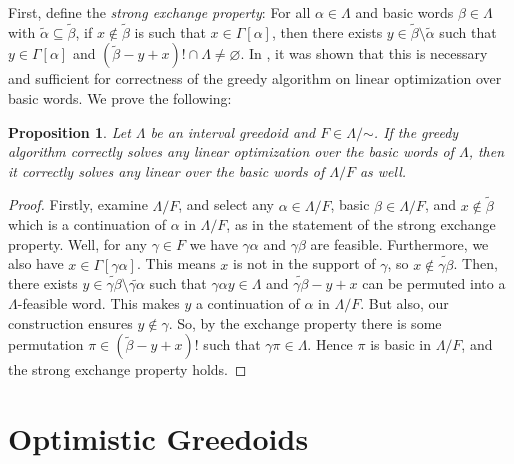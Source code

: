 \documentclass[11pt]{article}
\newtheorem{proposition}[theorem]{Proposition}
\newcommand{\glang}{\Lambda}
\begin{document}
First, define the \emph{strong exchange property}:
For all $\alpha \in \glang$ and basic words $\beta \in \glang$ with $\widetilde{\alpha}\subseteq\widetilde{\beta}$, if $x \notin\widetilde{\beta}$ is such that $x \in \Gamma[\alpha]$, then there exists $y\in\widetilde{\beta}\setminus\widetilde{\alpha}$ such that $y \in \Gamma[\alpha]$ and $(\widetilde{\beta} - y + x)!\cap\glang \neq \varnothing$.
In \cite{korte1984greedoids,goetschel1986linear}, it was shown that this is necessary and sufficient for correctness of the greedy algorithm on linear optimization over basic words.
We prove the following:
\begin{proposition}
    Let $\glang$ be an interval greedoid and $F\in\glang/\mathord{\sim}$.
    If the greedy algorithm correctly solves any linear optimization over the basic words of $\glang$, then it correctly solves any linear over the basic words of $\glang/F$ as well.
\end{proposition}
\begin{proof}
    Firstly, examine $\glang/F$, and select any $\alpha\in\glang/F$, basic $\beta\in\glang/F$, and $x\notin\widetilde{\beta}$ which is a continuation of $\alpha$ in $\glang/F$, as in the statement of the strong exchange property.
    Well, for any $\gamma\in F$ we have $\gamma\alpha$ and $\gamma\beta$ are feasible.
    Furthermore, we also have $x\in\Gamma[\gamma \alpha]$.
    This means $x$ is not in the support of $\gamma$, so $x \notin \widetilde{\gamma\beta}$.
    Then, there exists $y\in\widetilde{\gamma\beta}\setminus\widetilde{\gamma\alpha}$ such that $\gamma \alpha y\in\glang$ and $\widetilde{\gamma\beta} - y + x$ can be permuted into a $\glang$-feasible word.
    This makes $y$ a continuation of $\alpha$ in $\glang/F$.
    But also, our construction ensures $y \notin\gamma$.
    So, by the exchange property there is some permutation $\pi \in (\widetilde{\beta} - y + x)!$ such that $\gamma\pi \in \glang$.
    Hence $\pi$ is basic in $\glang/F$, and the strong exchange property holds.
\end{proof}


\iffalse
\section{Optimistic Greedoids}\label{app:optimism}
\end{document}

